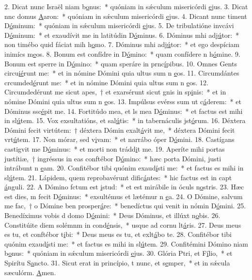 2. Dicat nunc Israël niam b\uline{o}nus:~* quóniam in sǽculum misericórdi \uline{e}jus.
3. Dicat nnc domus \uline{A}aron:~* quóniam in sǽculum misericórdi \uline{e}jus.
4. Dicant nunc  timent D\uline{ó}minum:~* quóniam in sǽculum misericórdi \uline{e}jus.
5. De tribulatióne invcávi D\uline{ó}minum:~* et exaudívit me in latitúdin D\uline{ó}minus.
6. Dóminus mhi adj\uline{ú}tor:~* non timébo quid fáciat mih h\uline{o}mo.
7. Dóminus mhi adj\uline{ú}tor:~* et ego despíciam inimícs m\uline{e}os.
8. Bonum est confídre in D\uline{ó}mino:~* quam confídere n h\uline{ó}mine.
9. Bonum est sperre in D\uline{ó}mino:~* quam speráre in prnc\uline{í}pibus.
10. Omnes Gents circu\uline{ié}runt me:~* et in nómine Dómini quia ultus sum n \uline{e}os.
11. Circumdántes crcumded\uline{é}runt me:~* et in nómine Dómini quia ultus sum n \uline{e}os.
12. Circumdedérunt me sicut apes,~† et exarsérunt sicut gnis in sp\uline{i}nis:~* et in nómine Dómini quia ultus sum n \uline{e}os.
13. Impúlsus evérss sum ut c\uline{á}derem:~* et Dóminus ssc\uline{é}pit me.
14. Fortitúdo mea, et ls mea D\uline{ó}minus:~* et factus est mihi in sl\uline{ú}tem.
15. Vox exsultatións, et sal\uline{ú}tis:~* in tabernáculis jst\uline{ó}rum.
16. Déxtera Dómini fecit virtútem:~† déxtera Dómin exalt\uline{á}vit me,~* déxtera Dómini fecit vrt\uline{ú}tem.
17. Non mórar, sed v\uline{i}vam:~* et narrábo óper D\uline{ó}mini.
18. Castígans castigvit me D\uline{ó}minus:~* et morti non trádd\uline{i}t me.
19. Aperíte mihi portas justítiæ,~† ingréssus in eas conftébor D\uline{ó}mino:~* hæc porta Dómini, justi intrábunt n \uline{e}am.
20. Confitébor tibi quónim exaud\uline{í}sti me:~* et factus es mihi in sl\uline{ú}tem.
21. Lápidem, quem reprobavérunt dific\uline{á}ntes:~* hic factus est in capt \uline{á}nguli.
22. A Dómino fctum est \uline{i}stud:~* et est mirábile in óculs n\uline{o}stris.
23. Hæc est dies, m fecit D\uline{ó}minus:~* exsultémus et lætémur n \uline{e}a.
24. O Dómine, salvum me fac,~† o Dómine ben prosper\uline{á}re:~* benedíctus qui venit in nómin D\uline{ó}mini.
25. Benedíximus vobis d domo D\uline{ó}mini:~* Deus Dóminus, et illúxt n\uline{o}bis.
26. Constitúite diem solémnm in cond\uline{é}nsis,~* usque ad cornu lt\uline{á}ris.
27. Deus meus es tu, et conftébor t\uline{i}bi:~* Deus meus es tu, et exlt\uline{á}bo te.
28. Confitébor tibi quónim exaud\uline{í}sti me:~* et factus es mihi in sl\uline{ú}tem.
29. Confitémini Dómino niam b\uline{o}nus:~* quóniam in sǽculum misericórdi \uline{e}jus.
30. Glória Ptri, et F\uline{í}lio,~* et Spirítu S\uline{a}ncto.
31. Sicut erat in princípio, t nunc, et s\uline{e}mper,~* et in sǽcula sæculórm. \uline{A}men.
